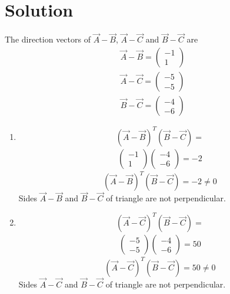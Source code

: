\documentclass[journal,12pt,twocolumn]{IEEEtran}
\newcommand{\myvec}[1]{\ensuremath{\begin{pmatrix}#1\end{pmatrix}}}
\begin{document}
\section{Solution}
The direction vectors of $\vec{A}-\vec{B}$, $\vec{A}-\vec{C}$ and $\vec{B}-\vec{C}$ are
\begin{align}
	\vec{A}-\vec{B} =\myvec{-1 \\ 1} \\
	\vec{A}-\vec{C} =\myvec{-5 \\ -5}\\
	\vec{B}-\vec{C} =\myvec{-4 \\ -6} 
\end{align}
\begin{enumerate}
\item \begin{equation*}{(\vec{A}-\vec{B})}^T  (\vec{B}-\vec{C})  = \end {equation*} \begin{align} \myvec{ -1 \\ 1 }  \myvec{ -4 \\ -6 } = -2 \end{align}
\begin{equation*}{(\vec{A}-\vec{B})}^T  (\vec{B}-\vec{C}) = -2 \neq 0 \end{equation*}
Sides $\vec{A}-\vec{B}$ and $\vec{B}-\vec{C}$ of triangle are not perpendicular.

\item \begin {equation*}{(\vec{A}-\vec{C})}^T  (\vec{B}-\vec{C}) =\end {equation*} \begin{align} \myvec{ -5 \\ -5 }  \myvec{ -4 \\ -6 } = 50\end{align}
\begin {equation*}{(\vec{A}-\vec{C})}^T  (\vec{B}-\vec{C}) = 50 \neq 0 \end {equation*}
Sides $\vec{A}-\vec{C}$ and $\vec{B}-\vec{C}$ of triangle are not perpendicular.


\end{enumerate}
\end{document}
